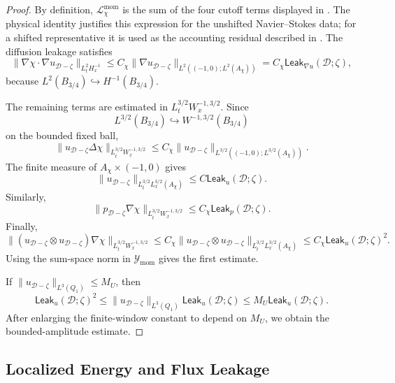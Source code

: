 \documentclass[11pt]{article}
\numberwithin{equation}{section}
\theoremstyle{definition}
\theoremstyle{remark}
\newcommand{\mom}{\mathrm{mom}}
\newcommand{\Leak}{\mathsf{Leak}}
\newcommand{\calD}{\mathcal D}
\newcommand{\Ymom}{\mathcal Y_{\mom}}
\newcommand{\Qone}{Q_1}
\begin{document}
\begin{proof}
By definition, \(\mathcal L_\chi^{\mom}\) is the sum of the four cutoff terms
displayed in .  The physical identity
justifies this expression for the unshifted Navier--Stokes data; for a shifted
representative it is used as the accounting residual described in
.  The diffusion leakage satisfies
\[
    \|\nabla\chi\cdot\nabla u_{\calD-\zeta}\|_{L^2_tH^{-1}_x}
    \le
    C_\chi
    \|\nabla u_{\calD-\zeta}\|_{L^2((-1,0);L^2(A_\chi))}
    =
    C_\chi\Leak_{\nabla u}(\calD;\zeta),
\]
because \(L^2(B_{3/4})\hookrightarrow H^{-1}(B_{3/4})\).

The remaining terms are estimated in
\(L^{3/2}_tW^{-1,3/2}_x\).  Since
\[
    L^{3/2}(B_{3/4})\hookrightarrow W^{-1,3/2}(B_{3/4})
\]
on the bounded fixed ball,
\[
    \|u_{\calD-\zeta}\Delta\chi\|_{L^{3/2}_tW^{-1,3/2}_x}
    \le
    C_\chi
    \|u_{\calD-\zeta}\|_{L^{3/2}((-1,0);L^{3/2}(A_\chi))}.
\]
The finite measure of \(A_\chi\times(-1,0)\) gives
\[
    \|u_{\calD-\zeta}\|_{L^{3/2}_tL^{3/2}_x(A_\chi)}
    \le
    C\Leak_u(\calD;\zeta).
\]
Similarly,
\[
    \|p_{\calD-\zeta}\nabla\chi\|_{L^{3/2}_tW^{-1,3/2}_x}
    \le
    C_\chi\Leak_p(\calD;\zeta).
\]
Finally,
\[
    \|(u_{\calD-\zeta}\otimes u_{\calD-\zeta})\nabla\chi\|_{L^{3/2}_tW^{-1,3/2}_x}
    \le
    C_\chi
    \|u_{\calD-\zeta}\otimes u_{\calD-\zeta}\|_{L^{3/2}_tL^{3/2}_x(A_\chi)}
    \le
    C_\chi\Leak_u(\calD;\zeta)^2.
\]
Using the sum-space norm in \(\Ymom\) gives the first estimate.

If \(\|u_{\calD-\zeta}\|_{L^3(\Qone)}\le M_U\), then
\[
    \Leak_u(\calD;\zeta)^2
    \le
    \|u_{\calD-\zeta}\|_{L^3(\Qone)}\Leak_u(\calD;\zeta)
    \le
    M_U\Leak_u(\calD;\zeta).
\]
After enlarging the finite-window constant to depend on \(M_U\), we obtain the
bounded-amplitude estimate.
\end{proof}

\subsection{Localized Energy and Flux Leakage}
\label{loc:sec:flux-leakage}
\end{document}
